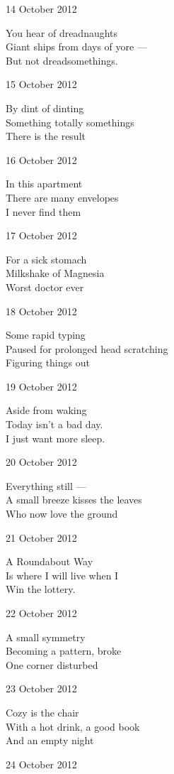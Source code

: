 \documentclass[12pt]{article}
\begin{document}
14 October 2012

You hear of dreadnaughts \\
Giant ships from days of yore --- \\
But not dreadsomethings.

15 October 2012

By dint of dinting \\
Something totally somethings \\
There is the result

16 October 2012

In this apartment \\
There are many envelopes \\
I never find them

17 October 2012

For a sick stomach \\
Milkshake of Magnesia \\
Worst doctor ever

\newpage

18 October 2012

Some rapid typing \\
Paused for prolonged head scratching \\
Figuring things out

19 October 2012

Aside from waking \\
Today isn't a bad day. \\
I just want more sleep.

20 October 2012

Everything still --- \\
A small breeze kisses the leaves \\
Who now love the ground

21 October 2012

A Roundabout Way \\
Is where I will live when I \\
Win the lottery.

22 October 2012

A small symmetry \\
Becoming a pattern, broke \\
One corner disturbed

23 October 2012

Cozy is the chair \\
With a hot drink, a good book \\
And an empty night

24 October 2012
\end{document}
